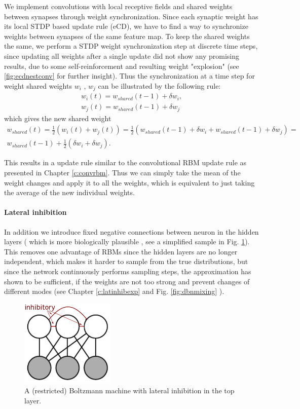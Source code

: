 We implement convolutions with local receptive fields and shared weights between synapses through weight synchronization.
Since each synaptic weight has its local STDP based update rule (eCD), we have to find a way to synchronize weights between synapses of the same feature map.
To keep the shared weights the same, we perform a STDP weight synchronization step at discrete time steps, since updating all weights after a single update did not show any promising results, due to some self-reinforcement and resulting weight "explosion" (see \ref{fig:ecdnestconv} for further insight).
Thus the synchronization at a time step for weight shared weights $w_i$ , $w_j$ can be illustrated by the following rule:  
\[
\begin{split}
w_i(t) = w_{shared}(t-1) + \delta w_i, \\ 
w_j(t) = w_{shared}(t-1) + \delta w_j 
\end{split}
\]
which gives the new shared weight
\[
\begin{split}
w_{shared}(t) = \frac{1}{2} (w_i(t) + w_j(t) ) = \frac{1}{2} (w_{shared}(t-1) + \delta w_i + w_{shared}(t-1) + \delta w_j) = \\ w_{shared}(t-1) + \frac{1}{2} (\delta w_i + \delta w_j).
\end{split}
\]

This results in a update rule similar to the convolutional RBM update rule as presented in Chapter \ref{c:convrbm}.
Thus we can simply take the mean of the weight changes and apply it to all the weights, which is equivalent to just taking the average of the new individual weights. 

\paragraph{Lateral inhibition} \label{c:latinhib}
In addition we introduce fixed negative connections between neuron in the hidden layers ( which is more biologically plausible \cite{King2013}, see a simplified sample in Fig. \ref{fig:bminhib}).
This removes one advantage of RBMs since the hidden layers are no longer independent, which makes it harder to sample from the true distributions, but since the network continuously performs sampling steps, the approximation has shown to be sufficient, if the weights are not too strong and prevent changes of different modes (see Chapter \ref{c:latinhibexp} and Fig. \ref{fig:dbnmixing} ).

\begin{figure}
	\centering
    	\includegraphics[width=0.4\textwidth]{imgs/lateral_inhib.png} 
    \caption{A (restricted) Boltzmann machine with lateral inhibition in the top layer.}
	\label{fig:bminhib}
\end{figure}


